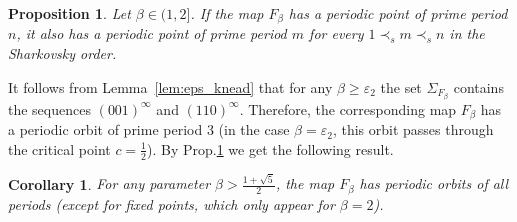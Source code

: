 \documentclass[10pt,reqno]{amsart}
\theoremstyle{plain}
\theoremstyle{assumption}
\theoremstyle{notation}
\theoremstyle{claim}
\theoremstyle{conj}
\theoremstyle{theorem}
\theoremstyle{proposition}
\newtheorem{proposition}{Proposition}[section]
\theoremstyle{corollary}
\newtheorem{corollary}{Corollary}[section]
\begin{document}
\begin{proposition}\label{prop:sharkovsky}
Let $\beta\in(1,2]$. If the map $F_{\beta}$ has a periodic point of prime period $n$, it also has a periodic point of prime period $m$ for every $1\prec_s m\prec_s n$ in the Sharkovsky order. 
\end{proposition}

It follows from Lemma~\ref{lem:eps_knead} that for any $\beta\geq\varepsilon_2$ the set $\Sigma_{F_{\beta}}$ contains the sequences $(001)^\infty$ and $(110)^\infty$. Therefore, the corresponding map $F_{\beta}$ has a periodic orbit of prime period $3$ (in the case $\beta=\varepsilon_2$, this orbit passes through the critical point $c=\frac{1}{2}$). By Prop.\ref{prop:sharkovsky} we get the following result.

\begin{corollary}\label{cor:all_periods}
    For any parameter $\beta>\frac{1+\sqrt{5}}{2}$, the map $F_{\beta}$ has periodic orbits of all periods (except for fixed points, which only appear for $\beta=2$).
\end{corollary}
\end{document}
